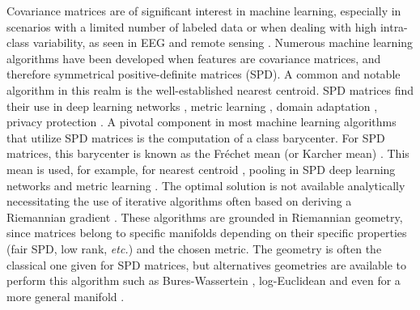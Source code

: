 \documentclass{article}
\theoremstyle{plain}
\theoremstyle{definition}
\theoremstyle{remark}
\begin{document}
Covariance matrices are of significant interest in machine learning, especially in scenarios with a limited number of labeled data or when dealing with high intra-class variability, as seen in EEG \cite{barachant2011multiclass} and remote sensing \cite{breizhcrops2020}. Numerous machine learning algorithms have been developed when features are covariance matrices, and therefore symmetrical positive-definite matrices (SPD).
A common and notable algorithm in this realm is the well-established nearest centroid. SPD matrices  find their use in deep learning networks \cite{huang2017riemannian,brooks2019riemannian}, metric learning \cite{zadeh2016,pmlr-v70-harandi17a}, domain adaptation \cite{kobler2022spd}, privacy protection \cite{reimherr2021}.
A pivotal component in most machine learning algorithms that utilize SPD matrices is the computation of a class barycenter. For SPD matrices, this barycenter is known as the Fréchet mean (or Karcher mean) \cite{bhatia}.
This mean is used, for example, for nearest centroid \cite{tuzel2008pedestrian}, pooling in SPD deep learning networks \cite{brooks2019riemannian} and metric learning \cite{zadeh2016}.
The optimal solution is not available analytically necessitating the use of iterative algorithms often based on deriving a Riemannian gradient \cite{boumal2023introduction}.
These algorithms are grounded in  Riemannian geometry, since matrices belong to specific manifolds depending on their specific properties (fair SPD, low rank, \emph{etc.}) and the chosen metric.
The geometry is often the classical one given for SPD matrices, but alternatives geometries are available to perform this algorithm such as Bures-Wassertein \cite{NEURIPS2021_4b04b0dc}, log-Euclidean \cite{utpala2023} and even for a more general manifold \cite{lou2020}.


\end{document}
